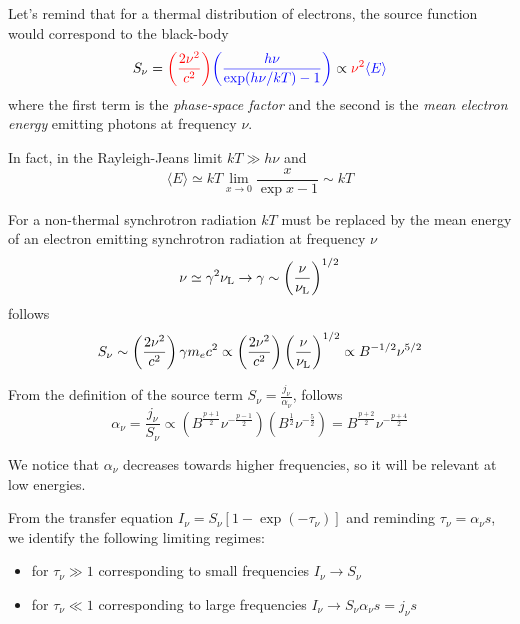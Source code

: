 Let's remind that for a thermal distribution of electrons, the source function would correspond to the black-body
%
\[
S_\nu = {\color{red}\left(\frac{2\nu^2}{c^2}\right)} {\color{blue}\left(\frac{h\nu}{\exp(h\nu / kT) - 1}\right)} 
\propto {\color{red}\nu^2} {\color{blue}\langle E \rangle}
\]
%
where the first term is the \emph{phase-space factor} and the second is the \emph{mean electron energy} emitting photons at frequency $\nu$.

In fact, in the Rayleigh-Jeans limit $kT \gg h\nu$ and
%
\[
\langle E \rangle \simeq kT \lim_{x\rightarrow 0} \frac{x}{\exp x - 1} \sim kT
\]

For a non-thermal synchrotron radiation $kT$ must be replaced by the mean energy of an electron emitting synchrotron radiation at frequency $\nu$
%
\begin{equation*}
\nu \simeq \gamma^2 \nu_{\rm L} \rightarrow \gamma \sim \left(\frac{\nu}{\nu_{\rm L}}\right)^{1/2}
\end{equation*}
%
follows
%
\begin{equation*}
S_\nu \sim \left( \frac{2\nu^2}{c^2} \right) \gamma m_e c^2
\propto \left( \frac{2\nu^2}{c^2} \right) \left(\frac{\nu}{\nu_{\rm L}}\right)^{1/2} 
\propto B^{-1/2} \nu^{5/2} 
\end{equation*}


From the definition of the source term \( S_\nu = \frac{j_\nu}{\alpha_\nu} \), follows
%
\[
\alpha_\nu = \frac{j_\nu}{S_\nu} 
\propto (B^{\frac{p+1}{2}} \nu^{-\frac{p-1}{2}}) (B^{\frac 1 2} \nu^{-\frac 5 2})
= B^{\frac{p+2}{2}} \nu^{-\frac{p + 4}{2}}
\]

We notice that $\alpha_\nu$ decreases towards higher frequencies, so it will be relevant at low energies.

From the transfer equation $I_\nu = S_\nu [1 - \exp(-\tau_\nu)]$ and reminding $\tau_\nu = \alpha_\nu s$, we identify the following limiting regimes:
%
\begin{itemize}
\item for $\tau_\nu \gg 1$ corresponding to small frequencies $I_\nu \rightarrow S_\nu$

\item for $\tau_\nu \ll 1$ corresponding to large frequencies $I_\nu \rightarrow S_\nu \alpha_\nu s = j_\nu s$
\end{itemize}


